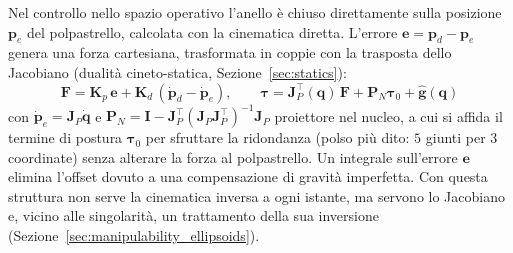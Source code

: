 Nel controllo nello spazio operativo l'anello è chiuso direttamente sulla posizione $\boldsymbol p_e$ del polpastrello, calcolata con la cinematica diretta. L'errore $\boldsymbol e=\boldsymbol p_d-\boldsymbol p_e$ genera una forza cartesiana, trasformata in coppie con la trasposta dello Jacobiano (dualità cineto-statica, Sezione~\ref{sec:statics}):
\begin{equation}
    \boldsymbol F=\boldsymbol K_p\,\boldsymbol e+\boldsymbol K_d\,(\dot{\boldsymbol p}_d-\dot{\boldsymbol p}_e),\qquad
    \boldsymbol\tau=\boldsymbol J_P^\top(\boldsymbol q)\,\boldsymbol F+\boldsymbol P_N\boldsymbol\tau_0+\hat{\boldsymbol g}(\boldsymbol q)
    \label{eq:ctrl_op}
\end{equation}
con $\dot{\boldsymbol p}_e=\boldsymbol J_P\dot{\boldsymbol q}$ e $\boldsymbol P_N=\boldsymbol I-\boldsymbol J_P^\top(\boldsymbol J_P\boldsymbol J_P^\top)^{-1}\boldsymbol J_P$ proiettore nel nucleo, a cui si affida il termine di postura $\boldsymbol\tau_0$ per sfruttare la ridondanza (polso più dito: $5$ giunti per $3$ coordinate) senza alterare la forza al polpastrello. Un integrale sull'errore $\boldsymbol e$ elimina l'offset dovuto a una compensazione di gravità imperfetta. Con questa struttura non serve la cinematica inversa a ogni istante, ma servono lo Jacobiano e, vicino alle singolarità, un trattamento della sua inversione (Sezione~\ref{sec:manipulability_ellipsoids}).


